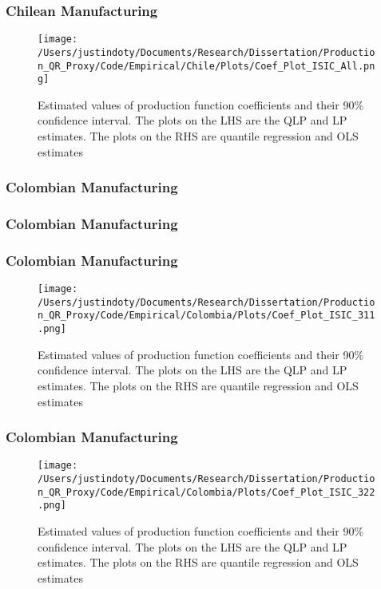 \documentclass{beamer}
\begin{document}
\begin{frame}
\frametitle{Chilean Manufacturing}
\begin{figure}[ht]
\centering
\texttt{[image: /Users/justindoty/Documents/Research/Dissertation/Production\_QR\_Proxy/Code/Empirical/Chile/Plots/Coef\_Plot\_ISIC\_All.png]}
\caption{Estimated values of production function coefficients and their 90\% confidence interval. The plots on the LHS are the QLP and LP estimates. The plots on the RHS are quantile regression and OLS estimates}
\end{figure}
\end{frame}


\begin{frame}
\frametitle{Colombian Manufacturing}
\scriptsize

\end{frame}

\begin{frame}
\frametitle{Colombian Manufacturing}
\scriptsize

\end{frame}

\begin{frame}
\frametitle{Colombian Manufacturing}
\begin{figure}[ht]
\centering
\texttt{[image: /Users/justindoty/Documents/Research/Dissertation/Production\_QR\_Proxy/Code/Empirical/Colombia/Plots/Coef\_Plot\_ISIC\_311.png]}
\caption{Estimated values of production function coefficients and their 90\% confidence interval. The plots on the LHS are the QLP and LP estimates. The plots on the RHS are quantile regression and OLS estimates}
\end{figure}
\end{frame}

\begin{frame}
\frametitle{Colombian Manufacturing}
\begin{figure}[ht]
\centering
\texttt{[image: /Users/justindoty/Documents/Research/Dissertation/Production\_QR\_Proxy/Code/Empirical/Colombia/Plots/Coef\_Plot\_ISIC\_322.png]}
\caption{Estimated values of production function coefficients and their 90\% confidence interval. The plots on the LHS are the QLP and LP estimates. The plots on the RHS are quantile regression and OLS estimates}
\end{figure}
\end{frame}
\end{document}
